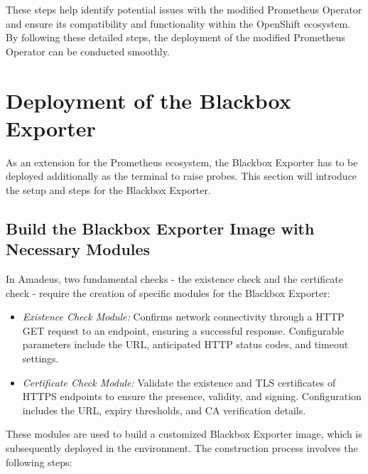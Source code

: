 These steps help identify potential issues with the modified Prometheus Operator and ensure its compatibility and functionality within the OpenShift ecosystem. By following these detailed steps, the deployment of the modified Prometheus Operator can be conducted smoothly. 

\section{Deployment of the Blackbox Exporter}

As an extension for the Prometheus ecosystem, the Blackbox Exporter has to be deployed additionally as the terminal to raise probes. This section will introduce the setup and steps for the Blackbox Exporter. 

\subsection{Build the Blackbox Exporter Image with Necessary Modules}

In Amadeus, two fundamental checks - the existence check and the certificate check - require the creation of specific modules for the Blackbox Exporter: 

\begin{itemize}
    \item \textit{Existence Check Module:} Confirms network connectivity through a \ac{HTTP} GET request to an endpoint, ensuring a successful response. Configurable parameters include the \ac{URL}, anticipated \ac{HTTP} status codes, and timeout settings. 
    \item \textit{Certificate Check Module:} Validate the existence and \ac{TLS} certificates of \ac{HTTPS} endpoints to ensure the presence, validity, and signing. Configuration includes the \ac{URL}, expiry thresholds, and CA verification details. 
\end{itemize}

These modules are used to build a customized Blackbox Exporter image, which is subsequently deployed in the environment. The construction process involves the following steps: 

